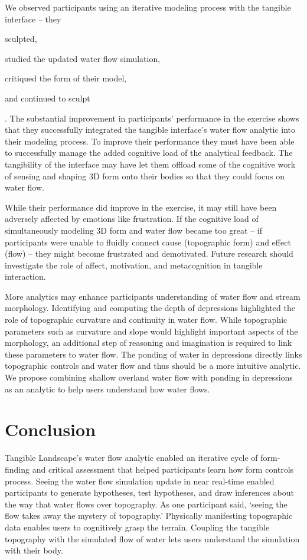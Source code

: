 \documentclass{isprs}
\begin{document}
We observed participants using an iterative modeling process with the tangible interface -- 
they 
\begin{enumerate*}[label=\alph*),font=\itshape]
\item sculpted, 
\item studied the updated water flow simulation, 
\item critiqued the form of their model, 
\item and continued to sculpt
\end{enumerate*}.
%
The substantial improvement in participants' performance in the  exercise
shows that they successfully integrated the tangible interface's water flow analytic 
into their modeling process. 
%
To improve their performance they must have been able to successfully manage 
the added cognitive load of the analytical feedback. 
%
The tangibility of the interface may have let them offload some of the cognitive work of sensing and shaping 3D form onto their bodies so that they could focus on water flow. 

While their performance did improve in the  exercise, it may still have been adversely affected by emotions like frustration. 
%
If the cognitive load of simultaneously modeling 3D form and water flow became too great
-- if participants were unable to fluidly connect cause (topographic form) and effect (flow) --
they might become frustrated and demotivated. 
%
Future research should investigate the role of affect, motivation, and metacognition in tangible interaction.

More analytics may enhance participants understanding of water flow and stream morphology. 
%
Identifying and computing the depth of depressions highlighted the role of topographic curvature and continuity in water flow. 
%
While topographic parameters such as curvature and slope would highlight important aspects of the morphology, 
an additional step of reasoning and imagination is required to link these parameters to water flow. 
%
The ponding of water in depressions directly links topographic controls and water flow 
and thus should be a more intuitive analytic. 
%
We propose combining shallow overland water flow with ponding in depressions
as an analytic to help users understand how water flows. 

\section{Conclusion}\label{sec:conclusion}
%
Tangible Landscape's water flow analytic enabled an iterative cycle of form-finding and critical assessment that helped participants learn how form controls process. 
%
Seeing the water flow simulation update in near real-time 
enabled participants to generate hypotheses, test hypotheses, and draw inferences 
about the way that water flows over topography. 
%
As one participant said, `seeing the flow takes away the mystery of topography.' 
%
Physically manifesting topographic data enables users to cognitively grasp the terrain. 
Coupling the tangible topography with the simulated flow of water 
lets users understand the simulation with their body. 
\end{document}
